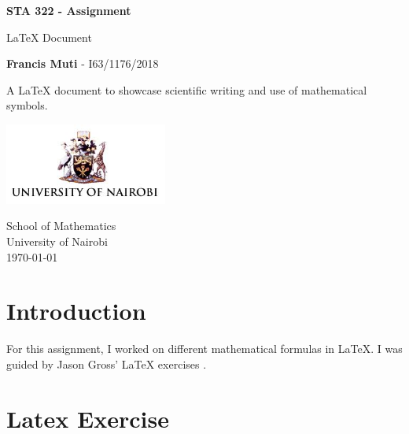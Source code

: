 \documentclass[a4paper]{article}
\begin{document}
\begin{titlepage}
	\begin{center}
		\vspace*{1cm}
		\Huge
		\textbf{STA 322 - Assignment}
		
		\vspace{0.5cm}		
		\LARGE
		\LaTeX \; Document
		\vspace{1.5cm}
		
		\textbf{Francis Muti} \textsc{- I63/1176/2018}
		\vfill
		
		A \LaTeX \; document to showcase scientific writing and
		use of mathematical symbols.
		
		\vspace{0.8cm}
		\includegraphics[width=0.4\textwidth]{uon.jpg}
		
		\Large
		School of Mathematics\\
		University of Nairobi\\
		\today \\
	\end{center}
\end{titlepage}

\section*{Introduction}
For this assignment, I worked on different mathematical formulas in 
\LaTeX. I was guided by Jason Gross' \LaTeX \; exercises \cite{latex_exercise}.

\section{Latex Exercise}
\label{sec:exercise}
\end{document}
